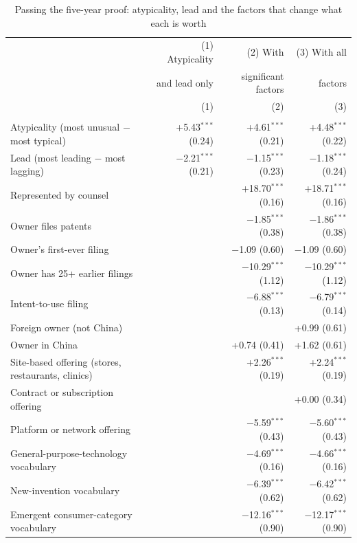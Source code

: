\begin{small}
\begin{longtable}{>{\raggedright\arraybackslash}p{5.9cm}rrr}
\caption{Passing the five-year proof: atypicality, lead and the factors that change what each is worth}\label{tab:reg}\\
\toprule & (1) Atypicality & (2) With & (3) With all \\ & and lead only & significant factors & factors \\ \midrule
\endfirsthead
\toprule & (1) & (2) & (3) \\ \midrule \endhead
\multicolumn{4}{l}{\textbf{A. Survival difference (percentage points)}} \\
Atypicality (most unusual $-$ most typical) & +5.43$^{***}$ (0.24) & +4.61$^{***}$ (0.21) & +4.48$^{***}$ (0.22) \\
Lead (most leading $-$ most lagging) & $-$2.21$^{***}$ (0.21) & $-$1.15$^{***}$ (0.23) & $-$1.18$^{***}$ (0.24) \\
\quad Represented by counsel & & +18.70$^{***}$ (0.16) & +18.71$^{***}$ (0.16) \\
\quad Owner files patents & & $-$1.85$^{***}$ (0.38) & $-$1.86$^{***}$ (0.38) \\
\quad Owner's first-ever filing & & $-$1.09 (0.60) & $-$1.09 (0.60) \\
\quad Owner has 25+ earlier filings & & $-$10.29$^{***}$ (1.12) & $-$10.29$^{***}$ (1.12) \\
\quad Intent-to-use filing & & $-$6.88$^{***}$ (0.13) & $-$6.79$^{***}$ (0.14) \\
\quad Foreign owner (not China) & &  & +0.99 (0.61) \\
\quad Owner in China & & +0.74 (0.41) & +1.62 (0.61) \\
\quad Site-based offering (stores, restaurants, clinics) & & +2.26$^{***}$ (0.19) & +2.24$^{***}$ (0.19) \\
\quad Contract or subscription offering & &  & +0.00 (0.34) \\
\quad Platform or network offering & & $-$5.59$^{***}$ (0.43) & $-$5.60$^{***}$ (0.43) \\
\quad General-purpose-technology vocabulary & & $-$4.69$^{***}$ (0.16) & $-$4.66$^{***}$ (0.16) \\
\quad New-invention vocabulary & & $-$6.39$^{***}$ (0.62) & $-$6.42$^{***}$ (0.62) \\
\quad Emergent consumer-category vocabulary & & $-$12.16$^{***}$ (0.90) & $-$12.17$^{***}$ (0.90) \\

\end{longtable}
\end{small}
